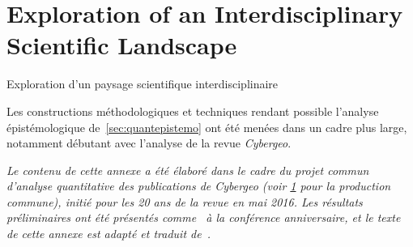 


\newpage


\section{Exploration of an Interdisciplinary Scientific Landscape}{Exploration d'un paysage scientifique interdisciplinaire}

\label{app:sec:cybergeo}





Les constructions méthodologiques et techniques rendant possible l'analyse épistémologique de~\ref{sec:quantepistemo} ont été menées dans un cadre plus large, notamment débutant avec l'analyse de la revue \textit{Cybergeo}.

 
\stars

\textit{Le contenu de cette annexe a été élaboré dans le cadre du projet commun d'analyse quantitative des publications de Cybergeo (voir \ref{} pour la production commune), initié pour les 20 ans de la revue en mai 2016. Les résultats préliminaires ont été présentés comme~\cite{raimbault2016indirect} à la conférence anniversaire, et le texte de cette annexe est adapté et traduit de~\cite{}.}


\stars





